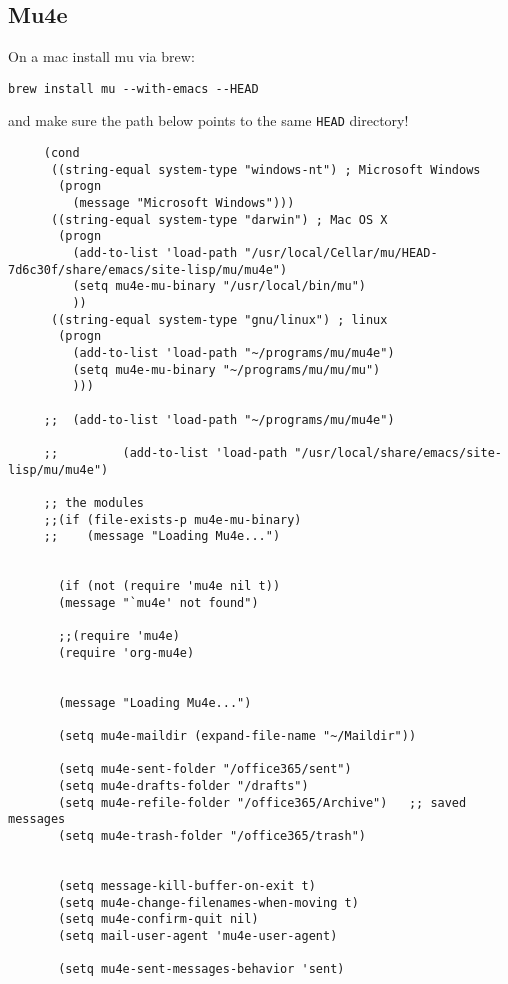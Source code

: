 \documentclass[12pt]{article}
\begin{document}
\subsection{Mu4e}
\label{sec:org95c10e7}

On a mac install mu via brew:

\begin{verbatim}
brew install mu --with-emacs --HEAD
\end{verbatim}

and make sure the path below points to the same \texttt{HEAD} directory!

\lstset{language=Lisp,label= ,caption= ,captionpos=b,numbers=none}
\begin{lstlisting}
     (cond
      ((string-equal system-type "windows-nt") ; Microsoft Windows
       (progn
         (message "Microsoft Windows")))
      ((string-equal system-type "darwin") ; Mac OS X
       (progn
         (add-to-list 'load-path "/usr/local/Cellar/mu/HEAD-7d6c30f/share/emacs/site-lisp/mu/mu4e")
         (setq mu4e-mu-binary "/usr/local/bin/mu")
         ))
      ((string-equal system-type "gnu/linux") ; linux
       (progn
         (add-to-list 'load-path "~/programs/mu/mu4e")
         (setq mu4e-mu-binary "~/programs/mu/mu/mu")
         )))

     ;;  (add-to-list 'load-path "~/programs/mu/mu4e")

     ;;         (add-to-list 'load-path "/usr/local/share/emacs/site-lisp/mu/mu4e")   

     ;; the modules
     ;;(if (file-exists-p mu4e-mu-binary)
     ;;    (message "Loading Mu4e...")


       (if (not (require 'mu4e nil t))
       (message "`mu4e' not found")

       ;;(require 'mu4e)
       (require 'org-mu4e)


       (message "Loading Mu4e...")

       (setq mu4e-maildir (expand-file-name "~/Maildir"))

       (setq mu4e-sent-folder "/office365/sent")
       (setq mu4e-drafts-folder "/drafts")
       (setq mu4e-refile-folder "/office365/Archive")   ;; saved messages
       (setq mu4e-trash-folder "/office365/trash")


       (setq message-kill-buffer-on-exit t)
       (setq mu4e-change-filenames-when-moving t)
       (setq mu4e-confirm-quit nil)
       (setq mail-user-agent 'mu4e-user-agent)

       (setq mu4e-sent-messages-behavior 'sent)


\end{lstlisting}
\end{document}
